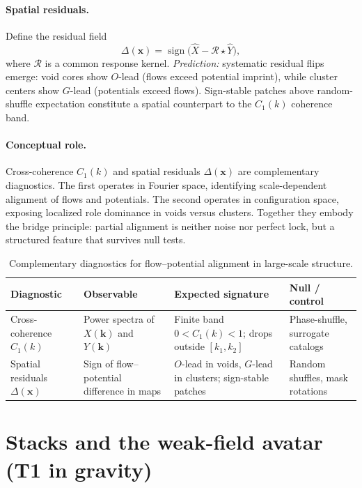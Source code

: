 \documentclass[12pt,a4paper,oneside]{scrreprt}
\begin{document}
\paragraph{Spatial residuals.} 
Define the residual field
\[
\Delta(\mathbf x) = \operatorname{sign}\!\Big(\widehat X 
- \mathcal R \star \widehat Y\Big),
\]
where $\mathcal R$ is a common response kernel. 
\emph{Prediction:} systematic residual flips emerge: 
void cores show $O$-lead (flows exceed potential imprint), 
while cluster centers show $G$-lead (potentials exceed flows). 
Sign-stable patches above random-shuffle expectation 
constitute a spatial counterpart to the $C_1(k)$ coherence band.

\paragraph{Conceptual role.} 
Cross-coherence $C_1(k)$ and spatial residuals $\Delta(\mathbf x)$ 
are complementary diagnostics. 
The first operates in Fourier space, identifying scale-dependent 
alignment of flows and potentials. 
The second operates in configuration space, exposing localized 
role dominance in voids versus clusters. 
Together they embody the bridge principle: 
partial alignment is neither noise nor perfect lock, 
but a structured feature that survives null tests.

\begin{table}[h]
\centering
\caption{Complementary diagnostics for flow--potential alignment in large-scale structure.}
\begin{tabular}{p{3cm} p{4cm} p{4cm} p{3.5cm}}
\toprule
\textbf{Diagnostic} & \textbf{Observable} & \textbf{Expected signature} & \textbf{Null / control} \\
\midrule
Cross-coherence $C_1(k)$ & Power spectra of $X(\mathbf k)$ and $Y(\mathbf k)$ & Finite band $0 < C_1(k) < 1$; drops outside $[k_1,k_2]$ & Phase-shuffle, surrogate catalogs \\
\addlinespace
Spatial residuals $\Delta(\mathbf x)$ & Sign of flow–potential difference in maps & $O$-lead in voids, $G$-lead in clusters; sign-stable patches & Random shuffles, mask rotations \\
\bottomrule
\end{tabular}
\end{table}

\section{Stacks and the weak-field avatar (T1 in gravity)}\label{sec:lss-stacks}
\end{document}
